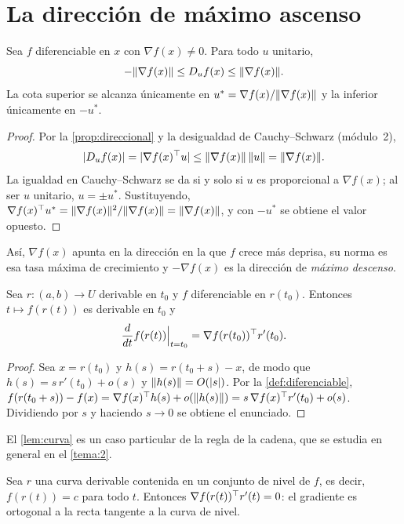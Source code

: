 \section{La dirección de máximo ascenso}

\begin{teorema}\label{teo:max-ascenso}
Sea $f$ diferenciable en $x$ con $\nabla f(x)\ne 0$. Para todo $u$ unitario,
\[
-\lVert\nabla f(x)\rVert\le D_u f(x)\le\lVert\nabla f(x)\rVert.
\]
La cota superior se alcanza únicamente en $u^{*}=\nabla f(x)/\lVert\nabla f(x)\rVert$ y la inferior únicamente en $-u^{*}$.
\end{teorema}

\begin{proof}
Por la \cref{prop:direccional} y la desigualdad de Cauchy--Schwarz (módulo~2),
\[
\lvert D_u f(x)\rvert=\lvert\nabla f(x)^{\top} u\rvert\le\lVert\nabla f(x)\rVert\,\lVert u\rVert=\lVert\nabla f(x)\rVert.
\]
La igualdad en Cauchy--Schwarz se da si y solo si $u$ es proporcional a $\nabla f(x)$; al ser $u$ unitario, $u=\pm u^{*}$. Sustituyendo, $\nabla f(x)^{\top} u^{*}=\lVert\nabla f(x)\rVert^{2}/\lVert\nabla f(x)\rVert=\lVert\nabla f(x)\rVert$, y con $-u^{*}$ se obtiene el valor opuesto.
\end{proof}

Así, $\nabla f(x)$ apunta en la dirección en la que $f$ crece más deprisa, su norma es esa tasa máxima de crecimiento y $-\nabla f(x)$ es la dirección de \emph{máximo descenso}.

\begin{lema}\label{lem:curva}
Sea $r\colon(a,b)\to U$ derivable en $t_0$ y $f$ diferenciable en $r(t_0)$. Entonces $t\mapsto f(r(t))$ es derivable en $t_0$ y
\[
\frac{d}{dt}f(r(t))\Big|_{t=t_0}=\nabla f(r(t_0))^{\top} r'(t_0).
\]
\end{lema}

\begin{proof}
Sea $x=r(t_0)$ y $h(s)=r(t_0+s)-x$, de modo que $h(s)=s\,r'(t_0)+o(s)$ y $\lVert h(s)\rVert=O(\lvert s\rvert)$. Por la \cref{def:diferenciable}, $f(r(t_0+s))-f(x)=\nabla f(x)^{\top} h(s)+o(\lVert h(s)\rVert)=s\,\nabla f(x)^{\top} r'(t_0)+o(s)$. Dividiendo por $s$ y haciendo $s\to 0$ se obtiene el enunciado.
\end{proof}

El \cref{lem:curva} es un caso particular de la regla de la cadena, que se estudia en general en el \cref{tema:2}.

\begin{corolario}\label{cor:nivel}
Sea $r$ una curva derivable contenida en un conjunto de nivel de $f$, es decir, $f(r(t))=c$ para todo $t$. Entonces $\nabla f(r(t))^{\top} r'(t)=0$: el gradiente es ortogonal a la recta tangente a la curva de nivel.
\end{corolario}

